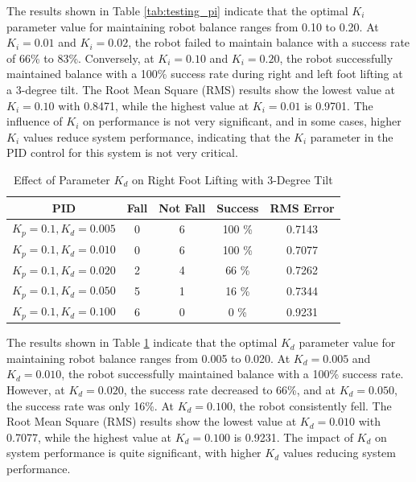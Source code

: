 \begin{enumerate}[label=\Alph*.]
    \hspace*{1em} The results shown in Table \ref{tab:testing_pi} indicate that the optimal $K_i$ parameter value for maintaining robot balance ranges from 0.10 to 0.20. At $K_i = 0.01$ and $K_i = 0.02$, the robot failed to maintain balance with a success rate of 66\% to 83\%. Conversely, at $K_i = 0.10$ and $K_i = 0.20$, the robot successfully maintained balance with a 100\% success rate during right and left foot lifting at a 3-degree tilt. The Root Mean Square (RMS) results show the lowest value at $K_i = 0.10$ with 0.8471, while the highest value at $K_i = 0.01$ is 0.9701. The influence of $K_i$ on performance is not very significant, and in some cases, higher $K_i$ values reduce system performance, indicating that the $K_i$ parameter in the PID control for this system is not very critical.

    \begin{table}[h]
        \centering
        \caption{Effect of Parameter $K_d$ on Right Foot Lifting with 3-Degree Tilt}
        \begin{tabular}{|c|c|c|c|c|}
            \hline
            \textbf{PID} & \textbf{Fall} & \textbf{Not Fall} & \textbf{Success} & RMS Error \\
            \hline
            $K_p = 0.1, K_d = 0.005$ & 0 & 6 & 100 \% & 0.7143 \\
            $K_p = 0.1, K_d = 0.010$ & 0 & 6 & 100 \% & 0.7077 \\
            $K_p = 0.1, K_d = 0.020$ & 2 & 4 & 66  \% & 0.7262 \\
            $K_p = 0.1, K_d = 0.050$ & 5 & 1 & 16  \% & 0.7344 \\
            $K_p = 0.1, K_d = 0.100$ & 6 & 0 & 0   \% & 0.9231 \\          
            \hline
        \end{tabular}
        \label{tab:testing_pd}
    \end{table}

    \hspace*{1em} The results shown in Table \ref{tab:testing_pd} indicate that the optimal $K_d$ parameter value for maintaining robot balance ranges from 0.005 to 0.020. At $K_d = 0.005$ and $K_d = 0.010$, the robot successfully maintained balance with a 100\% success rate. However, at $K_d = 0.020$, the success rate decreased to 66\%, and at $K_d = 0.050$, the success rate was only 16\%. At $K_d = 0.100$, the robot consistently fell. The Root Mean Square (RMS) results show the lowest value at $K_d = 0.010$ with 0.7077, while the highest value at $K_d = 0.100$ is 0.9231. The impact of $K_d$ on system performance is quite significant, with higher $K_d$ values reducing system performance.


\end{enumerate}
